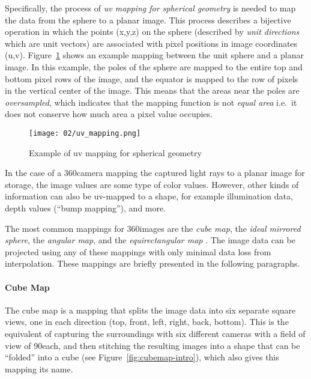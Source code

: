 Specifically, the process of \emph{uv mapping for spherical geometry} is needed to map the data from the sphere to a planar image. This process describes a bijective operation in which the points (x,y,z) on the sphere (described by \emph{unit directions} which are unit vectors) are associated with pixel positions in image coordinates (u,v). Figure~\ref{fig:uv_mapping} shows an example mapping between the unit sphere and a planar image. In this example, the poles of the sphere are mapped to the entire top and bottom pixel rows of the image, and the equator is mapped to the row of pixels in the vertical center of the image. This means that the areas near the poles are \emph{oversampled}, which indicates that the mapping function is not \emph{equal area} \cite[p.450]{hdrbook} i.e.\ it does not conserve how much area a pixel value occupies.

\begin{figure}[p]
		\centering
		\texttt{[image: 02/uv\_mapping.png]}
		\caption[UV mapping example]{Example of uv mapping for spherical geometry}
		\label{fig:uv_mapping}
\end{figure}

In the case of a 360\degree camera mapping the captured light rays to a planar image for storage, the image values are some type of color values. However, other kinds of information can also be uv-mapped to a shape, for example illumination data, depth values (``bump mapping''), and more.

The most common mappings for 360\degree images are the \emph{cube map}, the \emph{ideal mirrored sphere}, the \emph{angular map},  and the \emph{equirectangular map} \cite[p. 535]{hdrbook}. The image data can be projected using any of these mappings with only minimal data loss from interpolation. These mappings are briefly presented in the following paragraphs.

\paragraph{Cube Map}
The cube map is a mapping that splits the image data into six separate square views, one in each direction (top, front, left, right, back, bottom). This is the equivalent of capturing the surroundings with six different cameras with a field of view of 90\degree each, and then stitching the resulting images into a shape that can be ``folded'' into a cube (see Figure~\ref{fig:cubemap-intro}), which also gives this mapping its name.

